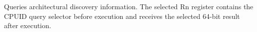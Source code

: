 Queries architectural discovery information. The selected Rn register contains the CPUID query selector before execution and receives the selected 64-bit result after execution.

